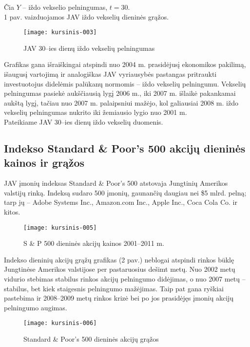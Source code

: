 \documentclass[12pt, a14paper, lithuanian]{article}
\begin{document}
Čia  $Y$ -- iždo vekselio pelningumas, $t = 30$. \\

1 pav. vaizduojamos JAV iždo vekselių dieninės grąžos.
   
\begin{figure}[H]
  \centering
\texttt{[image: kursinis-003]}
  \caption{JAV 30--ies dienų iždo vekselių pelningumas}
  \label{fig:1}
\end{figure}

Grafikas gana išraiškingai atspindi nuo 2004 m. prasidėjusį ekonomikos pakilimą, išaugusį vartojimą ir analogiškas
JAV vyriausybės pastangas pritraukti investuotojus didelėmis palūkanų normomis -- iždo vekselių pelningumu.
Vekselių pelningumas pasiekė aukščiausią lygį 2006 m., iki 2007 m. išlaikė pakankamai aukštą lygį, tačiau nuo 2007 m.
palaipsniui mažėjo, kol galiausiai 2008 m. iždo vekselių pelningumas nukrito iki žemiausio lygio nuo 2001 m. \\
Pateikiame JAV 30--ies dienų iždo vekselių duomenis\cite{tbills}.

\subsection{Indekso Standard \& Poor's 500 akcijų dieninės kainos ir grąžos}

JAV įmonių indeksas Standard \& Poor's 500 atstovaja Jungtinių Amerikos valstijų
rinką. Indeksą sudaro 500 įmonių, gaunančių daugiau nei \$5 mlrd. pelną; tarp jų -- Adobe Systems Inc.,
Amazon.com Inc., Apple Inc., Coca Cola Co. ir kitos. \\


\begin{figure}[H]
  \centering
\texttt{[image: kursinis-005]}
  \caption{S \& P 500 dieninės akcijų kainos 2001--2011 m.}
  \label{fig:2}
\end{figure}

Indekso dieninių akcijų grąžų grafikas (2 pav.) neblogai atspindi rinkos būklę Jungtinėse Amerikos valstijose per pastaruosius dešimt metų. Nuo 2002 metų vidurio stebimas stabilus rinkos akcijų pelningumo didėjimas, o nuo 2007 metų -- stabilus, bet kiek staigesnis pelningumo mažėjimas.
Taip pat gana ryškiai pastebima ir 2008--2009 metų rinkos krizė bei po jos prasidėjęs įmonių akcijų pelningumo augimas.

\begin{figure}[H]
  \centering
\texttt{[image: kursinis-006]}
  \caption{Standard \& Poor's 500 dieninės akcijų grąžos}
  \label{fig:3}
\end{figure}
\end{document}
